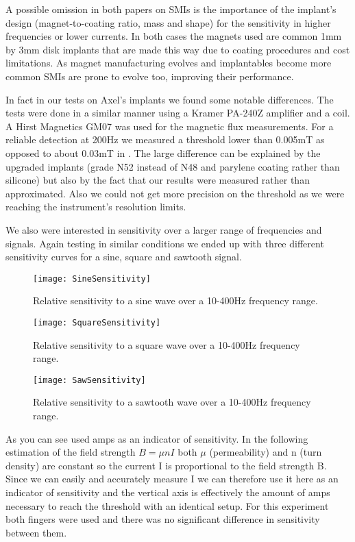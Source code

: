 \documentclass[10pt,journal,compsoc]{IEEEtran}
\begin{document}
	A possible omission in both papers on SMIs \cite{hameed2010ieee}\cite{harrison2018tf} is the importance of the implant's design (magnet-to-coating ratio, mass and shape) for the sensitivity in higher frequencies or lower currents. In both cases the magnets used are common 1mm by 3mm disk implants that are made this way due to coating procedures and cost limitations. As magnet manufacturing evolves and implantables become more common SMIs are prone to evolve too, improving their performance.
	
	In fact in our tests on Axel's implants we found some notable differences. The tests were done in a similar manner using a Kramer PA-240Z amplifier and a coil. A Hirst Magnetics GM07 was used for the magnetic flux measurements. For a reliable detection at 200Hz we measured a threshold lower than 0.005mT as opposed to about 0.03mT in \cite{harrison2018tf}. The large difference can be explained by the upgraded implants (grade N52 instead of N48 and parylene coating rather than silicone) but also by the fact that our results were measured rather than approximated. Also we could not get more precision on the threshold as we were reaching the instrument's resolution limits.
	
	We also were interested in sensitivity over a larger range of frequencies and signals. Again testing in similar conditions we ended up with three different sensitivity curves for a sine, square and sawtooth signal.
	
	\begin{figure}[!t]
		\centering
		\texttt{[image: SineSensitivity]}
		\caption{Relative sensitivity to a sine wave over a 10-400Hz frequency range.}
		\label{SineSensitivity}
	\end{figure}
	
	\begin{figure}[!t]
		\centering
		\texttt{[image: SquareSensitivity]}
		\caption{Relative sensitivity to a square wave over a 10-400Hz frequency range.}
		\label{SquareSensitivity}
	\end{figure}
	
	\begin{figure}[!t]
		\centering
		\texttt{[image: SawSensitivity]}
		\caption{Relative sensitivity to a sawtooth wave over a 10-400Hz frequency range.}
		\label{SawtoothSensitivity}
	\end{figure}
	
	As you can see used amps as an indicator of sensitivity. In the following estimation of the field strength $ B=\mu nI $ both $\mu$ (permeability) and n (turn density) are constant so the current I is proportional to the field strength B. Since we can easily and accurately measure I we can therefore use it here as an indicator of sensitivity and the vertical axis is effectively the amount of amps necessary to reach the threshold with an identical setup. For this experiment both fingers were used and there was no significant difference in sensitivity between them.
	
\end{document}
